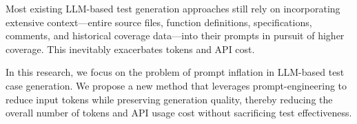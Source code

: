 Most existing LLM-based test generation approaches still rely on incorporating extensive context—entire source files, function definitions, specifications, comments, and historical coverage data—into their prompts in pursuit of higher coverage. This inevitably exacerbates tokens and API cost.

In this research, we focus on the problem of prompt inflation in LLM-based test case generation. We propose a new method that leverages prompt-engineering to reduce input tokens while preserving generation quality, thereby reducing the overall number of tokens and API usage cost without sacrificing test effectiveness.
